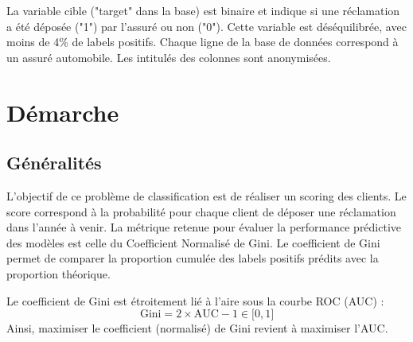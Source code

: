 \documentclass[french]{article}
\begin{document}
\begin{multicols}{2}
La variable cible ("target" dans la base) est binaire et indique si une réclamation a été déposée ("1") par l'assuré ou non ("0"). Cette variable est déséquilibrée, avec moins de 4\% de labels positifs. Chaque ligne de la base de données correspond à un assuré automobile. Les intitulés des colonnes sont anonymisées.



\section{Démarche} 

\subsection{Généralités}

L'objectif de ce problème de classification est de réaliser un scoring des clients. Le score correspond à la probabilité pour chaque client de déposer une réclamation dans l'année à venir. La métrique retenue pour évaluer la performance prédictive des modèles est celle du Coefficient Normalisé de Gini. Le coefficient de Gini permet de comparer la proportion cumulée des labels positifs prédits avec la proportion théorique. 

Le coefficient de Gini est étroitement lié à l'aire sous la courbe ROC (AUC) :
\[ \text{Gini} = 2 \times \text{AUC} - 1  \in \lbrack 0 , 1 \rbrack \]
Ainsi, maximiser le coefficient (normalisé) de Gini revient à maximiser l'AUC.







\end{multicols}
\end{document}
